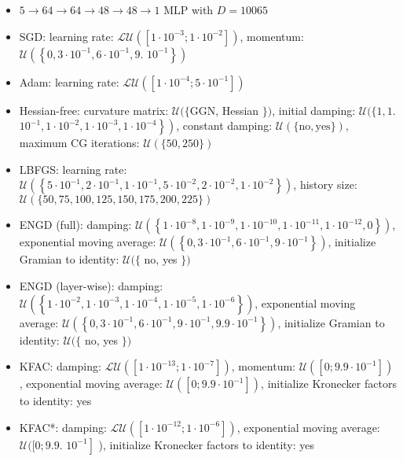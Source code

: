 \documentclass[10pt]{article}
\begin{document}
\begin{itemize}
  \item $5 \rightarrow 64 \rightarrow 64 \rightarrow 48 \rightarrow 48 \rightarrow 1$ MLP with $D=10065$
  \item SGD: learning rate: $\mathcal{L U}\left(\left[1 \cdot 10^{-3} ; 1 \cdot 10^{-2}\right]\right)$, momentum: $\mathcal{U}\left(\left\{0,3 \cdot 10^{-1}, 6 \cdot 10^{-1}, 9\right.\right.$. $\left.\left.10^{-1}\right\}\right)$
  \item Adam: learning rate: $\mathcal{L U}\left(\left[1 \cdot 10^{-4} ; 5 \cdot 10^{-1}\right]\right)$
  \item Hessian-free: curvature matrix: $\mathcal{U}(\{\mathrm{GGN}$, Hessian $\})$, initial damping: $\mathcal{U}(\{1,1$. $\left.\left.10^{-1}, 1 \cdot 10^{-2}, 1 \cdot 10^{-3}, 1 \cdot 10^{-4}\right\}\right)$, constant damping: $\mathcal{U}(\{\mathrm{no}, \mathrm{yes}\})$, maximum CG iterations: $\mathcal{U}(\{50,250\})$
  \item LBFGS: learning rate: $\mathcal{U}\left(\left\{5 \cdot 10^{-1}, 2 \cdot 10^{-1}, 1 \cdot 10^{-1}, 5 \cdot 10^{-2}, 2 \cdot 10^{-2}, 1 \cdot 10^{-2}\right\}\right)$, history size: $\mathcal{U}(\{50,75,100,125,150,175,200,225\})$
  \item ENGD (full): damping: $\mathcal{U}\left(\left\{1 \cdot 10^{-8}, 1 \cdot 10^{-9}, 1 \cdot 10^{-10}, 1 \cdot 10^{-11}, 1 \cdot 10^{-12}, 0\right\}\right)$, exponential moving average: $\mathcal{U}\left(\left\{0,3 \cdot 10^{-1}, 6 \cdot 10^{-1}, 9 \cdot 10^{-1}\right\}\right)$, initialize Gramian to identity: $\mathcal{U}(\{$ no, yes $\})$
  \item ENGD (layer-wise): damping: $\mathcal{U}\left(\left\{1 \cdot 10^{-2}, 1 \cdot 10^{-3}, 1 \cdot 10^{-4}, 1 \cdot 10^{-5}, 1 \cdot 10^{-6}\right\}\right)$, exponential moving average: $\mathcal{U}\left(\left\{0,3 \cdot 10^{-1}, 6 \cdot 10^{-1}, 9 \cdot 10^{-1}, 9.9 \cdot 10^{-1}\right\}\right)$, initialize Gramian to identity: $\mathcal{U}(\{$ no, yes $\})$
  \item KFAC: damping: $\mathcal{L U}\left(\left[1 \cdot 10^{-13} ; 1 \cdot 10^{-7}\right]\right)$, momentum: $\mathcal{U}\left(\left[0 ; 9.9 \cdot 10^{-1}\right]\right)$, exponential moving average: $\mathcal{U}\left(\left[0 ; 9.9 \cdot 10^{-1}\right]\right)$, initialize Kronecker factors to identity: yes
  \item KFAC*: damping: $\mathcal{L U}\left(\left[1 \cdot 10^{-12} ; 1 \cdot 10^{-6}\right]\right)$, exponential moving average: $\mathcal{U}([0 ; 9.9$. $\left.10^{-1}\right]$ ), initialize Kronecker factors to identity: yes

\end{itemize}
\end{document}
